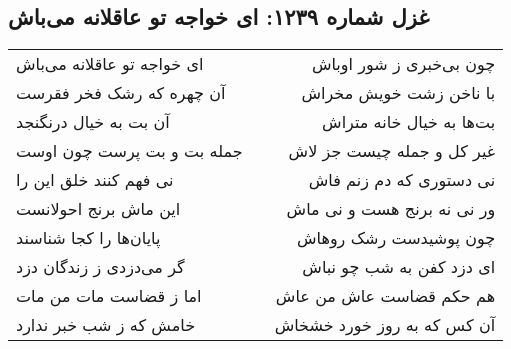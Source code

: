 \begin{center}
\section*{غزل شماره ۱۲۳۹: ای خواجه تو عاقلانه می‌باش}
\label{sec:1239}
\begin{longtable}{l p{0.5cm} r}
ای خواجه تو عاقلانه می‌باش
&&
چون بی‌خبری ز شور اوباش
\\
آن چهره که رشک فخر فقرست
&&
با ناخن زشت خویش مخراش
\\
آن بت به خیال درنگنجد
&&
بت‌ها به خیال خانه متراش
\\
جمله بت و بت پرست چون اوست
&&
غیر کل و جمله چیست جز لاش
\\
نی فهم کنند خلق این را
&&
نی دستوری که دم زنم فاش
\\
این ماش برنج احولانست
&&
ور نی نه برنج هست و نی ماش
\\
پایان‌ها را کجا شناسند
&&
چون پوشیدست رشک روهاش
\\
گر می‌دزدی ز زندگان دزد
&&
ای دزد کفن به شب چو نباش
\\
اما ز قضاست مات من مات
&&
هم حکم قضاست عاش من عاش
\\
خامش که ز شب خبر ندارد
&&
آن کس که به روز خورد خشخاش
\\
\end{longtable}
\end{center}
